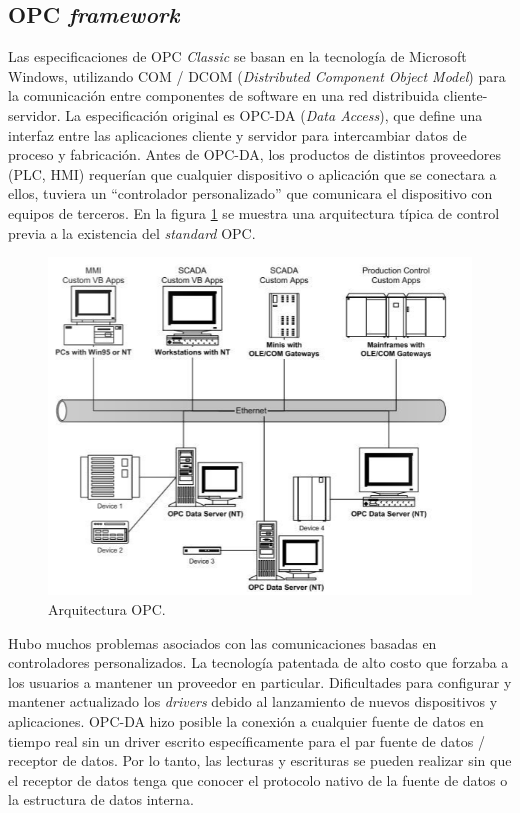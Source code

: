 \subsection{OPC \textit{framework}}

Las especificaciones de OPC \textit{Classic} se basan en la tecnología de Microsoft Windows, utilizando COM / DCOM (\textit{Distributed Component Object Model}) para la comunicación entre componentes de software en una red distribuida cliente-servidor. La especificación original es OPC-DA (\textit{Data Access}), que define una interfaz entre las aplicaciones cliente y servidor para intercambiar datos de proceso y fabricación. Antes de OPC-DA, los productos de distintos proveedores (PLC, HMI) requerían que cualquier dispositivo o aplicación que se conectara a ellos, tuviera un ``controlador personalizado'' que comunicara el dispositivo con equipos de terceros. En la figura \ref{fig:OPCAQ} se muestra una arquitectura típica de control previa a la existencia del \textit{standard} OPC.

\begin{figure}[htpb]
	\centering
	\includegraphics[scale=0.7]{./Figures/opc_1.png}
	\caption{Arquitectura OPC\protect\footnotemark.}
	\label{fig:OPCAQ}
\end{figure}


Hubo muchos problemas asociados con las comunicaciones basadas en controladores personalizados. La tecnología patentada de alto costo que forzaba a los usuarios a mantener un proveedor en particular. Dificultades para configurar y  mantener actualizado los \textit{drivers} debido al lanzamiento de nuevos dispositivos y aplicaciones. OPC-DA hizo posible la conexión a cualquier fuente de datos en tiempo real sin un driver escrito específicamente para el par fuente de datos / receptor de datos. Por lo tanto, las lecturas y escrituras se pueden realizar sin que el receptor de datos tenga que conocer el protocolo nativo de la fuente de datos o la estructura de datos interna.\\ 


